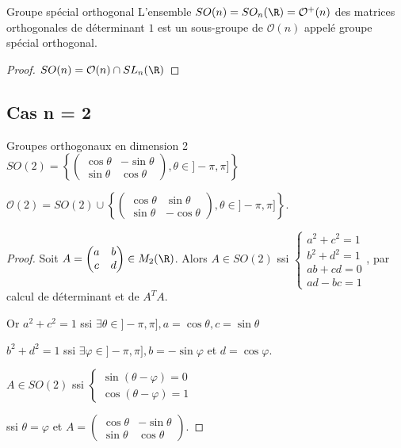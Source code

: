 \begin{theoreme}{Groupe spécial orthogonal}{}
    L'ensemble $SO(n) = SO_n(\R) = \mathcal O^+(n)$ des matrices orthogonales de déterminant $1$ est un 
    sous-groupe de $\mathcal O(n)$ appelé groupe spécial orthogonal. 
\end{theoreme}

\begin{proof}
    $SO(n) = \mathcal O(n) \cap SL_n(\R)$
\end{proof}

\subsection{Cas n = 2}

\begin{theoreme}{Groupes orthogonaux en dimension 2}{}
    $SO(2) = \left\{ \begin{pmatrix}
        \cos \theta & -\sin \theta \\
        \sin \theta & \cos \theta
        \end{pmatrix}, \theta \in ]- \pi, \pi] \right\}$
        
        $\mathcal O(2) = SO(2) \cup \left\{ \begin{pmatrix}
        \cos \theta & \sin \theta \\
        \sin \theta & -\cos \theta
        \end{pmatrix}, \theta \in ]- \pi, \pi] \right\}$.
\end{theoreme}

\begin{proof}
    Soit $A = \begin{pmatrix}
        a & b \\
        c & d
    \end{pmatrix} \in M_2(\R)$. Alors $A \in SO(2)$ ssi 
    $\begin{cases}
        a^2 + c^2 = 1 \\
        b^2 + d^2 = 1 \\
        ab + cd = 0 \\
        ad - bc = 1
    \end{cases}$, par calcul de déterminant et de $A^T A$.

    Or $a^2 + c^2 = 1$ ssi $\exists \theta \in ]- \pi, \pi], a = \cos \theta, c = \sin \theta$ 

    $b^2 + d^2 = 1$ ssi $\exists \varphi \in ]- \pi, \pi], b = - \sin \varphi$ et $d = \cos \varphi$.

    $A \in SO(2)$ ssi 
    $\begin{cases}
        \sin (\theta - \varphi) = 0 \\
        \cos (\theta - \varphi) = 1
    \end{cases}$

    ssi $\theta = \varphi$ et $A = \begin{pmatrix}
        \cos \theta & -\sin \theta \\
        \sin \theta & \cos \theta
    \end{pmatrix}$.
\end{proof}

